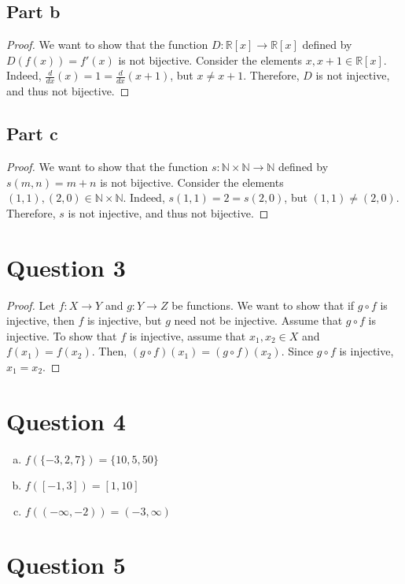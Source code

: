 \documentclass{article}
\begin{document}
\subsection*{Part b}
\begin{proof}
We want to show that the function $D: \mathbb{R}[x] \to \mathbb{R}[x]$ defined by $D(f(x)) = f'(x)$ is not bijective.
Consider the elements $x, x + 1 \in \mathbb{R}[x]$.
Indeed, $\frac{d}{dx}(x) = 1 = \frac{d}{dx}(x + 1)$, but $x \neq x + 1$.
Therefore, $D$ is not injective, and thus not bijective.
\end{proof}

\subsection*{Part c}
\begin{proof}
We want to show that the function $s: \mathbb{N} \times \mathbb{N} \to \mathbb{N}$ defined by $s(m, n) = m + n$ is not bijective.
Consider the elements $(1, 1), (2, 0) \in \mathbb{N} \times \mathbb{N}$.
Indeed, $s(1, 1) = 2 = s(2, 0)$, but $(1, 1) \neq (2, 0)$.
Therefore, $s$ is not injective, and thus not bijective.
\end{proof}

\section*{Question 3}
\begin{proof}
Let $f: X \to Y$ and $g: Y \to Z$ be functions.
We want to show that if $g \circ f$ is injective, then $f$ is injective, but $g$ need not be injective.
Assume that $g \circ f$ is injective.
To show that $f$ is injective, assume that $x_1, x_2 \in X$ and $f(x_1) = f(x_2)$.
Then, $(g \circ f)(x_1) = (g \circ f)(x_2)$.
Since $g \circ f$ is injective, $x_1 = x_2$.
\end{proof}

\section*{Question 4}
\begin{enumerate}[(a)]
    \item $f(\{-3, 2, 7\}) = \{10, 5, 50\}$
    \item $f([-1, 3]) = [1, 10]$
    \item $f((-\infty, -2)) = (-3, \infty)$
\end{enumerate}

\section*{Question 5}
\end{document}
